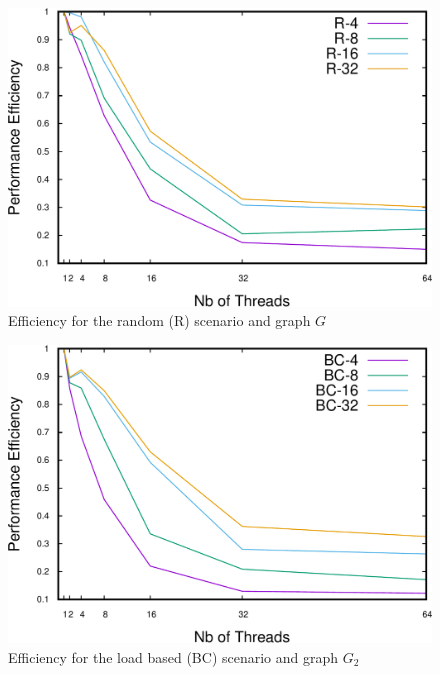 \begin{figure}
\centering
\includegraphics[scale=0.35]{bench/bench-efficiency/efficiency-r-1-crop.pdf}
\caption{Efficiency for the random (R) scenario and graph $G$}
\label{fig:effr1}
\end{figure}

\begin{figure}
\centering
\includegraphics[scale=0.35]{bench/bench-efficiency/efficiency-bc-2-crop.pdf}
\caption{Efficiency for the load based (BC) scenario and graph $G_2$}
\label{fig:effbc2}
\end{figure}

